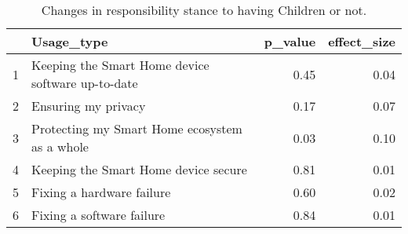 \begin{table}[ht]
\centering
\begin{tabular}{rlrr}
  \hline
 & Usage\_type & p\_value & effect\_size \\ 
  \hline
1 & Keeping the Smart Home device software up-to-date & 0.45 & 0.04 \\ 
  2 & Ensuring my privacy & 0.17 & 0.07 \\ 
  3 & Protecting my Smart Home ecosystem as a whole & 0.03 & 0.10 \\ 
  4 & Keeping the Smart Home device secure & 0.81 & 0.01 \\ 
  5 & Fixing a hardware failure & 0.60 & 0.02 \\ 
  6 & Fixing a software failure & 0.84 & 0.01 \\ 
   \hline
\end{tabular}
\caption{Changes in responsibility stance to having Children or not.} 
\end{table}
